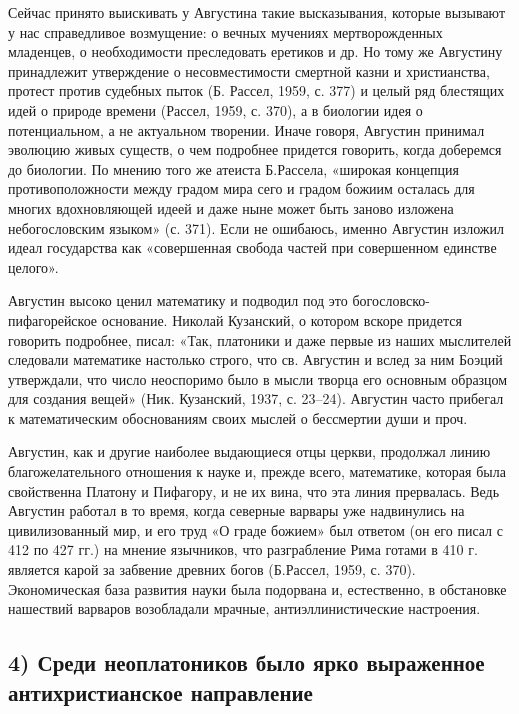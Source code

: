 Сейчас  принято выискивать  у  Августина  такие высказывания,  которые
вызывают   у   нас   справедливое  возмущение:   о   вечных   мучениях
мертворожденных  младенцев, о  необходимости  преследовать еретиков  и
др.  Но тому  же Августину  принадлежит утверждение  о несовместимости
смертной  казни  и христианства,  протест  против  судебных пыток  (Б.
Рассел, 1959,  с. 377) и  целый ряд  блестящих идей о  природе времени
(Рассел,  1959, с.  370),  а в  биологии идея  о  потенциальном, а  не
актуальном творении.  Иначе говоря,  Августин принимал  эволюцию живых
существ,  о  чем  подробнее  придется  говорить,  когда  доберемся  до
биологии.  По мнению  того  же атеиста  Б.Рассела, «широкая  концепция
противоположности  между градом  мира  сего и  градом божиим  осталась
для  многих  вдохновляющей  идеей  и   даже  ныне  может  быть  заново
изложена  небогословским языком»  (с. 371).  Если не  ошибаюсь, именно
Августин изложил идеал государства как «совершенная свобода частей при
совершенном единстве целого».

Августин    высоко   ценил    математику    и    подводил   под    это
богословско-пифагорейское  основание.  Николай  Кузанский,  о  котором
вскоре  придется говорить  подробнее,  писал: «Так,  платоники и  даже
первые из наших мыслителей  следовали математике настолько строго, что
св. Августин  и вслед за  ним Боэций утверждали, что  число неоспоримо
было в  мысли творца его  основным образцом для создания  вещей» (Ник.
Кузанский, 1937, с. 23--24).  Августин часто прибегал к математическим
обоснованиям своих мыслей о бессмертии души и проч.

Августин,  как и  другие  наиболее выдающиеся  отцы церкви,  продолжал
линию благожелательного отношения к науке и, прежде всего, математике,
которая была  свойственна Платону и  Пифагору, и  не их вина,  что эта
линия прервалась.  Ведь Августин  работал в  то время,  когда северные
варвары уже  надвинулись на  цивилизованный мир, и  его труд  «О граде
божием»  был  ответом (он  его  писал  с 412  по  427  гг.) на  мнение
язычников, что  разграбление Рима  готами в 410  г. является  карой за
забвение древних  богов (Б.Рассел,  1959, с. 370).  Экономическая база
развития науки  была подорвана и, естественно,  в обстановке нашествий
варваров возобладали мрачные, антиэллинистические настроения.

\subsection{4)    Среди    неоплатоников    было    ярко    выраженное
антихристианское направление}

